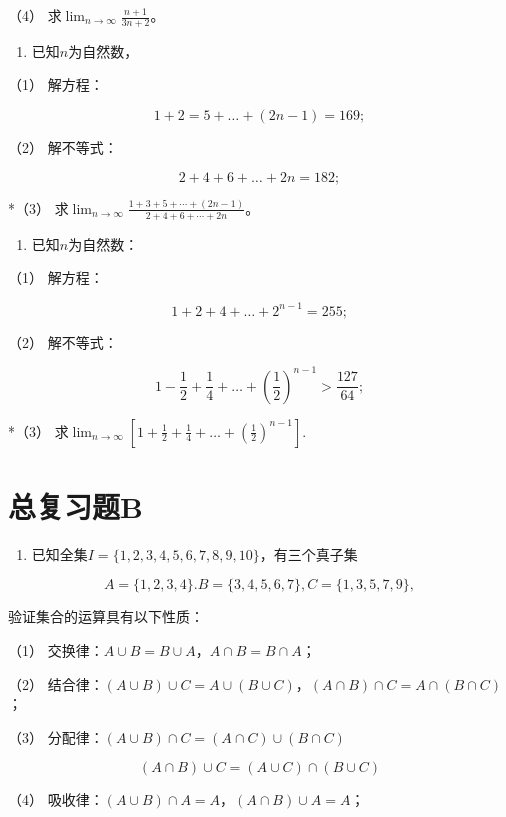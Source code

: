 （4） 求\(\lim_{n\to\infty}\frac{n+1}{3n+2}\)。

\begin{enumerate}[start=44]
\item
  已知\(n\)为自然数，
\end{enumerate}

（1） 解方程：

\[
1 + 2 = 5 + \dots + (2 n - 1) = 169;
\]

（2） 解不等式：

\[
2 + 4 + 6 + \dots + 2 n = 182;
\]

*（3）
求\(\lim_{n\to \infty}\frac{1 + 3 + 5 + \cdots + (2n - 1)}{2 + 4 + 6 + \cdots + 2n}\)。

\begin{enumerate}[start=45]
\item
  已知\(n\)为自然数：
\end{enumerate}

（1） 解方程：

\[
1 + 2 + 4 + \dots + 2^{n - 1} = 255;
\]

（2） 解不等式：

\[
1 - \frac{1}{2} + \frac{1}{4} + \dots + \left(\frac{1}{2}\right)^{n - 1} > \frac{127}{64};
\]

*（3）
求\(\lim_{n\to \infty}\left[1 + \frac{1}{2} +\frac{1}{4} +\dots +\left(\frac{1}{2}\right)^{n - 1}\right].\)

\chapter{总复习题B}

\begin{enumerate}
\item
  已知全集\(I = \{1, 2, 3, 4, 5, 6, 7, 8, 9, 10\}\)，有三个真子集
\end{enumerate}

\[
A = \{1, 2, 3, 4 \}. B = \{3, 4, 5, 6, 7 \}, C = \{1, 3, 5, 7, 9 \},
\]

验证集合的运算具有以下性质：

（1） 交换律：\(A \cup B = B \cup A\)，\(A \cap B = B \cap A\)；

（2）
结合律：\((A \cup B) \cup C = A \cup (B \cup C)\)，\((A \cap B) \cap C = A \cap (B \cap C)\)；

（3） 分配律：\((A \cup B) \cap C = (A \cap C) \cup (B \cap C)\)

\[
(A \cap B) \cup C = (A \cup C) \cap (B \cup C)
\]

（4） 吸收律：\((A \cup B) \cap A = A\)，\((A \cap B) \cup A = A\)；

